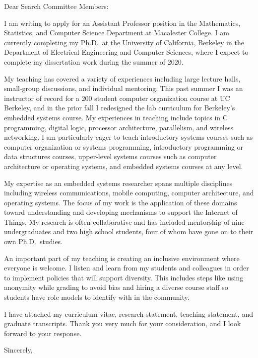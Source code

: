 \documentclass{letter}
\begin{document}
\begin{letter}{}
\date{}

\opening{Dear Search Committee Members:}

I am writing to apply for an
Assistant Professor
position in the
Mathematics, Statistics, and Computer Science Department
at Macalester College.
%
I am currently completing my Ph.D.\ at the University of California, Berkeley
in the Department of Electrical Engineering and Computer Sciences, where I
expect to complete my dissertation work during the summer of 2020.

My teaching has covered a variety of experiences including
large lecture halls, small-group discussions, and individual mentoring.
%
This past summer I was an instructor of record for a 200 student computer
organization course at UC Berkeley, and in the prior fall I redesigned the lab
curriculum for Berkeley's embedded systems course.
%
My experiences in teaching include topics in C programming, digital logic,
processor architecture, parallelism, and wireless networking.
%
%
I am particularly eager to teach
introductory systems courses such as computer organization or systems programming,
introductory programming or data structures courses,
upper-level systems courses such as computer architecture or operating systems,
and embedded systems courses at any level.

My expertise as an embedded systems researcher spans multiple disciplines
including wireless communications, mobile computing, computer architecture, and
operating systems.
%
The focus of my work is the application of these domains toward understanding
and developing mechanisms to support the Internet of Things.
%
My research is often collaborative and has included mentorship of nine
undergraduates and two high school students, four of whom have gone on to
their own Ph.D.\ studies.


An important part of my teaching is creating an inclusive environment where
everyone is welcome. I listen and learn from my students and colleagues
in order to implement policies that will support diversity.
%
This includes steps like using anonymity while grading to avoid bias and hiring
a diverse course staff so students have role models to identify with in the community.

I have attached
my curriculum vitae,
research statement,
teaching statement,
and graduate transcripts.
%
Thank you very much for your consideration, and I look forward to your response.

\closing{Sincerely,}

\end{letter}
\end{document}
